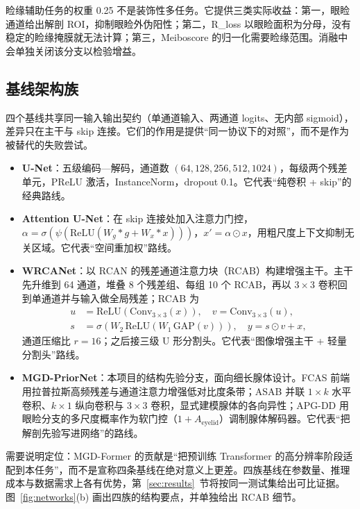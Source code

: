 睑缘辅助任务的权重 0.25 不是装饰性多任务。它提供三类实际收益：第一，眼睑通道给出解剖 ROI，抑制眼睑外伪阳性；第二，R\_loss 以眼睑面积为分母，没有稳定的睑缘掩膜就无法计算；第三，Meiboscore 的归一化需要睑缘范围。消融中会单独关闭该分支以检验增益。

\subsection{基线架构族}\label{sec:baselines}

四个基线共享同一输入输出契约（单通道输入、两通道 logits、无内部 sigmoid），差异只在主干与 skip 连接。它们的作用是提供“同一协议下的对照”，而不是作为被替代的失败尝试。

\begin{itemize}
\item \textbf{U-Net}\cite{ronneberger2015unet}：五级编码—解码，通道数 $(64,128,256,512,1024)$，每级两个残差单元，PReLU 激活，InstanceNorm，dropout 0.1。它代表“纯卷积 + skip”的经典路线。
\item \textbf{Attention U-Net}\cite{oktay2018attention}：在 skip 连接处加入注意力门控，
$\alpha=\sigma(\psi(\mathrm{ReLU}(W_g*g+W_x*x)))$，$x'=\alpha\odot x$，用粗尺度上下文抑制无关区域。它代表“空间重加权”路线。
\item \textbf{WRCANet}：以 RCAN 的残差通道注意力块（RCAB）构建增强主干\cite{zhang2018rcan}。主干先升维到 64 通道，堆叠 8 个残差组、每组 10 个 RCAB，再以 $3\times3$ 卷积回到单通道并与输入做全局残差；RCAB 为
\begin{align}
u &= \mathrm{ReLU}(\mathrm{Conv}_{3\times3}(x)),\quad v=\mathrm{Conv}_{3\times3}(u),\\
s &= \sigma\!\left(W_2\,\mathrm{ReLU}\!\left(W_1\,\mathrm{GAP}(v)\right)\right),\quad y=s\odot v+x,
\end{align}
通道压缩比 $r=16$；之后接三级 U 形分割头。它代表“图像增强主干 + 轻量分割头”路线。
\item \textbf{MGD-PriorNet}：本项目的结构先验分支，面向细长腺体设计。FCAS 前端用拉普拉斯高频残差与通道注意力增强低对比度条带；ASAB 并联 $1\times k$ 水平卷积、$k\times1$ 纵向卷积与 $3\times3$ 卷积，显式建模腺体的各向异性；APG-DD 用眼睑分支的多尺度概率作为软门控（$1+A_{\mathrm{eyelid}}$）调制腺体解码器。它代表“把解剖先验写进网络”的路线。
\end{itemize}

需要说明定位：MGD-Former 的贡献是“把预训练 Transformer 的高分辨率阶段适配到本任务”，而不是宣称四条基线在绝对意义上更差。四族基线在参数量、推理成本与数据需求上各有优势，第~\ref{sec:results}~节将按同一测试集给出可比证据。图~\ref{fig:networks}(b) 画出四族的结构要点，并单独给出 RCAB 细节。

